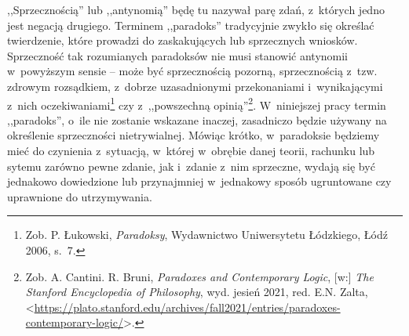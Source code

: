 ,,Sprzecznością'' lub ,,antynomią'' będę tu nazywał parę zdań, z~których jedno jest negacją drugiego. Terminem ,,paradoks'' tradycyjnie zwykło się określać twierdzenie, które prowadzi do zaskakujących lub sprzecznych wniosków. Sprzeczność tak rozumianych paradoksów nie musi stanowić antynomii w~powyższym sensie -- może być sprzecznością pozorną, sprzecznością z~tzw. zdrowym rozsądkiem, z~dobrze uzasadnionymi przekonaniami i~wynikającymi z~nich oczekiwaniami\footnote{Zob. P. Łukowski, \textit{Paradoksy}, Wydawnictwo Uniwersytetu Łódzkiego, Łódź 2006, s.~7.} czy z~,,powszechną opinią''\footnote{Zob. A. Cantini. R. Bruni, \textit{Paradoxes and Contemporary Logic}, [w:] \textit{The Stanford Encyclopedia of Philosophy}, wyd. jesień 2021, red. E.N. Zalta, {\textless}\url{https://plato.stanford.edu/archives/fall2021/entries/paradoxes-contemporary-logic/}{\textgreater}.}. W~niniejszej pracy termin ,,paradoks'', o~ile nie zostanie wskazane inaczej, zasadniczo będzie używany na określenie sprzeczności nietrywialnej. Mówiąc krótko, w~paradoksie będziemy mieć do czynienia z~sytuacją, w~której w~obrębie danej teorii, rachunku lub sytemu zarówno pewne zdanie, jak i~zdanie z~nim sprzeczne, wydają się być jednakowo dowiedzione lub przynajmniej w~jednakowy sposób ugruntowane czy uprawnione do utrzymywania.

